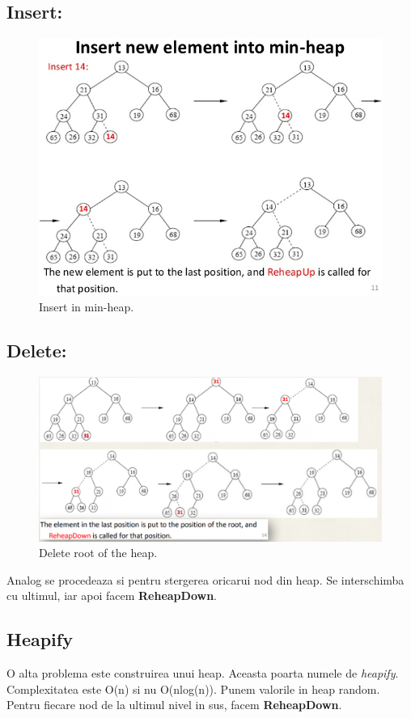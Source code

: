 \documentclass[11pt,a4paper]{article}
\theoremstyle{definition}
\theoremstyle{plain}
\theoremstyle{remark}
\begin{document}
\subsection*{Insert: }
\begin{figure}[H]
    \centering
    \includegraphics[width=0.8\linewidth]{insert-minheap.png}
    \caption{Insert in min-heap.}
    \label{fig:enter-label}
\end{figure}

\subsection*{Delete: }
\begin{figure}[H]
    \centering
    \includegraphics[width=0.85\linewidth]{heap-delete-root.png}
    \caption{Delete root of the heap.}
    \label{fig:enter-label}
\end{figure}

Analog se procedeaza si pentru stergerea oricarui nod din heap. Se interschimba cu ultimul, iar apoi facem \textbf{ReheapDown}.

\subsection*{Heapify}
O alta problema este construirea unui heap. Aceasta poarta numele de \textit{heapify}. Complexitatea este O(n) si nu O(nlog(n)). Punem valorile in heap random. Pentru fiecare nod de la ultimul nivel in sus, facem \textbf{ReheapDown}.
\end{document}
